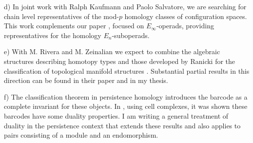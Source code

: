 d) In joint work with Ralph Kaufmann and Paolo Salvatore, we are searching for chain level representatives of the mod-$p$ homology classes of configuration spaces. This work complements our paper \cite{medina2020maysteenrod}, focused on $E_\infty$-operads, providing representatives for the homology $E_n$-suboperads.

e) With M. Rivera and M. Zeinalian we expect to combine the algebraic structures describing homotopy types \cite{sullivan1977infinitesimal, mandell2001padic} and those developed by Ranicki for the classification of topological manifold structures \cite{ranicki1992topological}. Substantial partial results in this direction can be found in their paper \cite{rivera2019functor} and in my thesis.

f) The classification theorem in persistence homology introduces the barcode as a complete invariant for these objects. In \cite{de2011dualities}, using cell complexes, it was shown these barcodes have some duality properties. I am writing a general treatment of duality in the persistence context that extends these results and also applies to pairs consisting of a module and an endomorphism.